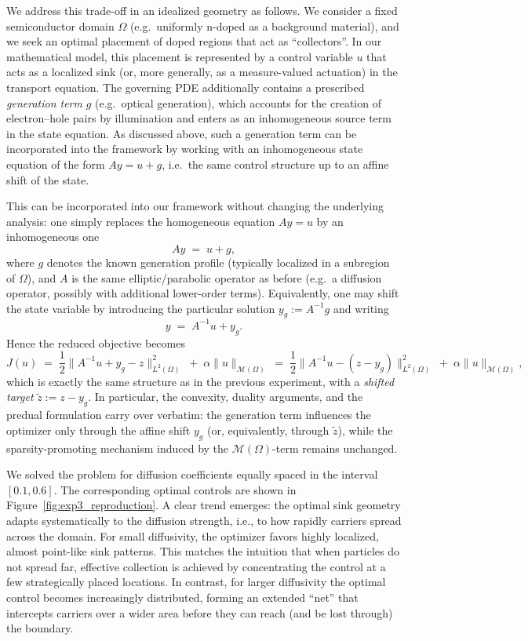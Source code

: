 \documentclass[11pt,a4paper]{article}
\begin{document}
We address this trade-off in an idealized geometry as follows.
We consider a fixed semiconductor domain $\Omega$ (e.g.\ uniformly n-doped as a background material), and we seek an optimal placement of doped regions that act as ``collectors''.
In our mathematical model, this placement is represented by a control variable $u$ that acts as a localized sink (or, more generally, as a measure-valued actuation) in the transport equation.
The governing PDE additionally contains a prescribed \emph{generation term} $g$ (e.g.\ optical generation), which accounts for the creation of electron--hole pairs by illumination and enters as an inhomogeneous source term in the state equation.
As discussed above, such a generation term can be incorporated into the framework by working with an inhomogeneous state equation of the form $A y = u + g$, i.e.\ the same control structure up to an affine shift of the state.

This can be incorporated into our framework without changing the underlying analysis: one simply replaces the homogeneous equation $A y = u$ by an inhomogeneous one
\begin{equation}\label{eq:state_with_generation}
A y \;=\; u + g,
\end{equation}
where $g$ denotes the known generation profile (typically localized in a subregion of $\Omega$), and $A$ is the same elliptic/parabolic operator as before (e.g.\ a diffusion operator, possibly with additional lower-order terms).
Equivalently, one may shift the state variable by introducing the particular solution $y_g := A^{-1}g$ and writing
\[
y \;=\; A^{-1}u + y_g .
\]
Hence the reduced objective becomes
\[
J(u) \;=\; \frac12\|A^{-1}u + y_g - z\|_{L^2(\Omega)}^2 \;+\; \alpha \|u\|_{\mathcal{M}(\Omega)}
\;=\; \frac12\|A^{-1}u - (z-y_g)\|_{L^2(\Omega)}^2 \;+\; \alpha \|u\|_{\mathcal{M}(\Omega)} ,
\]
which is exactly the same structure as in the previous experiment, with a \emph{shifted target} $\tilde z := z - y_g$.
In particular, the convexity, duality arguments, and the predual formulation carry over verbatim: the generation term influences the optimizer only through the affine shift $y_g$ (or, equivalently, through $\tilde z$), while the sparsity-promoting mechanism induced by the $\mathcal{M}(\Omega)$-term remains unchanged.

We solved the problem for diffusion coefficients equally spaced in the interval $[0.1,0.6]$. The corresponding optimal controls are shown in Figure~\ref{fig:exp3_reproduction}. A clear trend emerges: the optimal sink geometry adapts systematically to the diffusion strength, i.e., to how rapidly carriers spread across the domain. For small diffusivity, the optimizer favors highly localized, almost point-like sink patterns. This matches the intuition that when particles do not spread far, effective collection is achieved by concentrating the control at a few strategically placed locations. In contrast, for larger diffusivity the optimal control becomes increasingly distributed, forming an extended “net” that intercepts carriers over a wider area before they can reach (and be lost through) the boundary.
\end{document}
